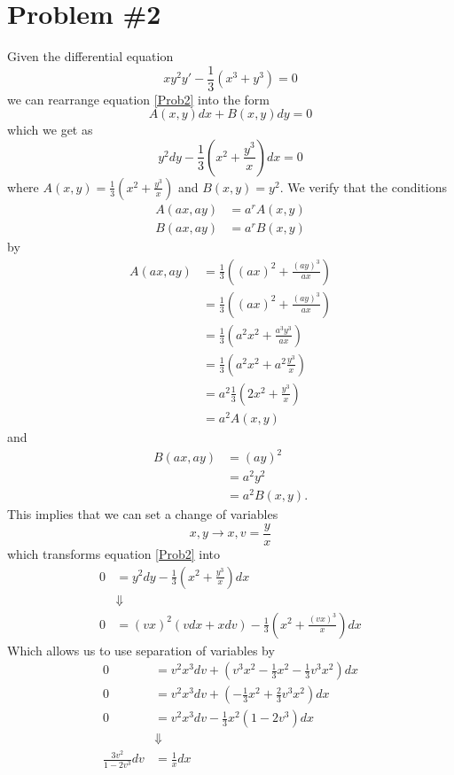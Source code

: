 \documentclass[11pt]{article}
\numberwithin{equation}{section}
\begin{document}
\section{Problem \#2}
Given the differential equation 
\begin{equation}
xy^2y' - \frac{1}{3}(x^3+y^3) = 0
\label{Prob2}
\end{equation}
we can rearrange equation \ref{Prob2} into the form
$$A(x,y)dx + B(x,y)dy = 0$$
which we get as
$$y^2dy - \frac{1}{3}\left(x^2+\frac{y^3}{x}\right)dx = 0$$
where $A(x,y) = \frac{1}{3}\left(x^2+\frac{y^3}{x}\right)$ and $B(x,y) = y^2$. We verify 
that the conditions
\begin{align*}
A(ax,ay) &= a^rA(x,y)\\
B(ax,ay) &= a^rB(x,y)
\end{align*}
by
\begin{align*}
A(ax,ay) &= \frac{1}{3}\left((ax)^2+\frac{(ay)^3}{ax}\right) \\
&= \frac{1}{3}\left((ax)^2+\frac{(ay)^3}{ax}\right)\\
&= \frac{1}{3}\left(a^2x^2+\frac{a^3y^3}{ax}\right)\\
&= \frac{1}{3}\left(a^2x^2+a^2\frac{y^3}{x}\right)\\
&= a^2\frac{1}{3}\left(2x^2+\frac{y^3}{x}\right)\\
&= a^2A(x,y)
\end{align*}
and
\begin{align*}
B(ax,ay) &= (ay)^2\\
&= a^2y^2\\
&= a^2B(x,y).
\end{align*}
This implies that we can set a change of variables
$$x,y\rightarrow x,v=\frac{y}{x}$$
which transforms equation \ref{Prob2} into
\begin{align*}
0 &= y^2dy - \frac{1}{3}\left(x^2+\frac{y^3}{x}\right)dx\\
&\Downarrow\\
0 &= (vx)^2(vdx+xdv) - \frac{1}{3}\left(x^2+\frac{(vx)^3}{x}\right)dx
\end{align*}
Which allows us to use separation of variables by
\begin{align*}
0 &= v^2x^3dv + \left(v^3x^2 - \frac{1}{3}x^2-\frac{1}{3}v^3x^2\right)dx\\
0 &= v^2x^3dv + \left(-\frac{1}{3}x^2+\frac{2}{3}v^3x^2\right)dx\\
0 &= v^2x^3dv - \frac{1}{3}x^2\left(1-2v^3\right)dx\\
&\Downarrow\\
\frac{3v^2}{1-2v^3}dv &= \frac{1}{x}dx
\end{align*}
\end{document}
